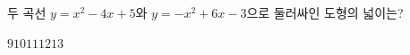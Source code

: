 두 곡선 $y=x^2-4x+5$와 $y=-x^2+6x-3$으로 둘러싸인 도형의 넓이는?
\begin{choices32}{$9$}{$10$}{$11$}{$12$}{$13$}\end{choices32}
